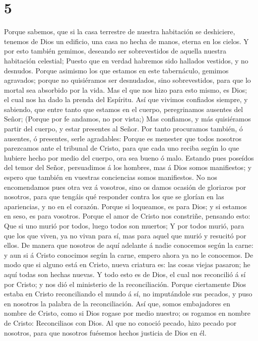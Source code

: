 \hypertarget{section-4}{%
\section{5}\label{section-4}}

 Porque sabemos, que si la casa terrestre de nuestra
habitación se deshiciere, tenemos de Dios un edificio, una casa no hecha
de manos, eterna en los cielos.  Y por esto también
gemimos, deseando ser sobrevestidos de aquella nuestra habitación
celestial;  Puesto que en verdad habremos sido hallados
vestidos, y no desnudos.  Porque asimismo los que estamos
en este tabernáculo, gemimos agravados; porque no quisiéramos ser
desnudados, sino sobrevestidos, para que lo mortal sea absorbido por la
vida.  Mas el que nos hizo para esto mismo, es Dios; el
cual nos ha dado la prenda del Espíritu.  Así que vivimos
confiados siempre, y sabiendo, que entre tanto que estamos en el cuerpo,
peregrinamos ausentes del Señor;  (Porque por fe andamos,
no por vista;)  Mas confiamos, y más quisiéramos partir
del cuerpo, y estar presentes al Señor.  Por tanto
procuramos también, ó ausentes, ó presentes, serle agradables:
 Porque es menester que todos nosotros parezcamos ante el
tribunal de Cristo, para que cada uno reciba según lo que hubiere hecho
por medio del cuerpo, ora sea bueno ó malo.  Estando pues
poseídos del temor del Señor, persuadimos á los hombres, mas á Dios
somos manifiestos; y espero que también en vuestras conciencias somos
manifiestos.  No nos encomendamos pues otra vez á
vosotros, sino os damos ocasión de gloriaros por nosotros, para que
tengáis qué responder contra los que se glorían en las apariencias, y no
en el corazón.  Porque si loqueamos, es para Dios; y si
estamos en seso, es para vosotros.  Porque el amor de
Cristo nos constriñe, pensando esto: Que si uno murió por todos, luego
todos son muertos;  Y por todos murió, para que los que
viven, ya no vivan para sí, mas para aquel que murió y resucitó por
ellos.  De manera que nosotros de aquí adelante á nadie
conocemos según la carne: y aun si á Cristo conocimos según la carne,
empero ahora ya no le conocemos.  De modo que si alguno
está en Cristo, nueva criatura es: las cosas viejas pasaron; he aquí
todas son hechas nuevas.  Y todo esto es de Dios, el cual
nos reconcilió á sí por Cristo; y nos dió el ministerio de la
reconciliación.  Porque ciertamente Dios estaba en Cristo
reconciliando el mundo á sí, no imputándole sus pecados, y puso en
nosotros la palabra de la reconciliación.  Así que, somos
embajadores en nombre de Cristo, como si Dios rogase por medio nuestro;
os rogamos en nombre de Cristo: Reconciliaos con Dios. 
Al que no conoció pecado, hizo pecado por nosotros, para que nosotros
fuésemos hechos justicia de Dios en él.


